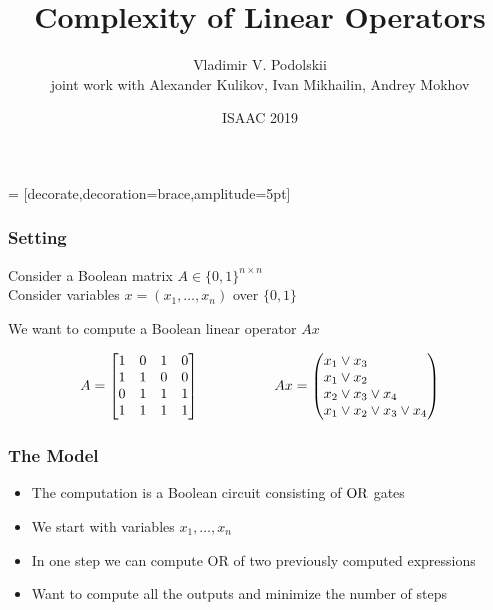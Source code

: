 \documentclass{beamer}
\author{Vladimir V. Podolskii\inst{1}\\[3mm] \small joint work with Alexander Kulikov, Ivan Mikhailin, Andrey Mokhov}
\institute{
 \inst{1} \  Steklov\ Mathematical\ Institute, Moscow\\
 Higher School of Economics, Moscow\\
}
\date{ISAAC 2019}
\title{Complexity of Linear Operators}
\begin{document}
 = [decorate,decoration={brace,amplitude=5pt}]


\begin{frame}

\titlepage

\end{frame}



\begin{frame}
\frametitle{Setting}

Consider a Boolean matrix $A \in \{0,1\}^{n\times n}$\\
Consider variables $x = (x_1,\ldots, x_n)$ over $\{0,1\}$

\medskip
We want to compute a Boolean linear operator $A x$

\medskip

\[
  A =\begin{bmatrix}
    1 & 0 & 1 & 0 \\
    1 & 1 & 0 & 0 \\
    0 & 1 & 1 & 1 \\
    1 & 1 & 1 & 1 \\
  \end{bmatrix}
 \ \ \ \ \ \ \ \ \ \ \ \ \ \ \ \ Ax = \left(\begin{array}{@{}l@{}}
    x_1 \vee x_3 \\
    x_1 \vee x_2 \\
    x_2 \vee x_3 \vee x_4 \\
    x_1 \vee x_2 \vee x_3 \vee x_4\\
  \end{array}\right)
  \]



\end{frame}



\begin{frame}
\frametitle{The Model}

\begin{itemize}
\item The computation is a Boolean circuit consisting of ${\rm OR}$ gates
\item We start with variables $x_1,\ldots, x_n$
\item In one step we can compute OR of two previously computed expressions
\item Want to compute all the outputs and minimize the number of steps
\end{itemize}

\end{frame}
\end{document}
